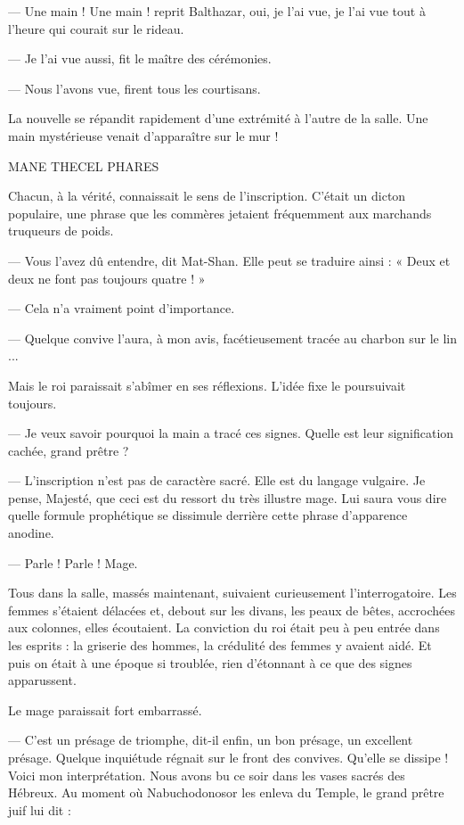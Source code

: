 \documentclass[a4paper, 11pt, oneside, polutonikogreek, french]{article}
\begin{document}
--- Une main ! Une main ! reprit Balthazar, oui, je l'ai vue, je l'ai vue tout à l'heure qui courait sur le rideau.

--- Je l'ai vue aussi, fit le maître des cérémonies.

--- Nous l'avons vue, firent tous les courtisans.

La nouvelle se répandit rapidement d'une extrémité à l'autre de la salle. Une main mystérieuse venait d'apparaître sur le mur !

MANE THECEL PHARES

Chacun, à la vérité, connaissait le sens de l'inscription. C'était un dicton populaire, une phrase que les commères jetaient fréquemment aux marchands truqueurs de poids.

--- Vous l'avez dû entendre, dit Mat-Shan. Elle peut se traduire ainsi : « Deux et deux ne font pas toujours quatre ! »

--- Cela n'a vraiment point d'importance.

--- Quelque convive l'aura, à mon avis, facétieusement tracée au charbon sur le lin ...

Mais le roi paraissait s'abîmer en ses réflexions. L'idée fixe le poursuivait toujours.

--- Je veux savoir pourquoi la main a tracé ces signes. Quelle est leur signification cachée, grand prêtre ?

--- L'inscription n'est pas de caractère sacré. Elle est du langage vulgaire. Je pense, Majesté, que ceci est du ressort du très illustre mage. Lui saura vous dire quelle formule prophétique se dissimule derrière cette phrase d'apparence anodine.

--- Parle ! Parle ! Mage.

Tous dans la salle, massés maintenant, suivaient curieusement l'interrogatoire. Les femmes s'étaient délacées et, debout sur les divans, les peaux de bêtes, accrochées aux colonnes, elles écoutaient. La conviction du roi était peu à peu entrée dans les esprits : la griserie des hommes, la crédulité des femmes y avaient aidé. Et puis on était à une époque si troublée, rien d'étonnant à ce que des signes apparussent.

Le mage paraissait fort embarrassé.

--- C'est un présage de triomphe, dit-il enfin, un bon présage, un excellent présage. Quelque inquiétude régnait sur le front des convives. Qu'elle se dissipe ! Voici mon interprétation. Nous avons bu ce soir dans les vases sacrés des Hébreux. Au moment où Nabuchodonosor les enleva du Temple, le grand prêtre juif lui dit :
\end{document}
